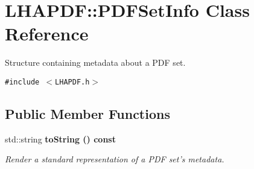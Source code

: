 \section{LHAPDF::PDFSet\-Info Class Reference}
\label{classLHAPDF_1_1PDFSetInfo}
Structure containing metadata about a PDF set.  


{\tt \#include $<$LHAPDF.h$>$}

\subsection*{Public Member Functions}
\begin{CompactItemize}
\item 
std::string \bf{to\-String} () const \label{classLHAPDF_1_1PDFSetInfo_f297ab15d85a7127a6a7f0dff9a1cf6d}

\begin{CompactList}\small\item\em Render a standard representation of a PDF set's metadata. \item\end{CompactList}\end{CompactItemize}
